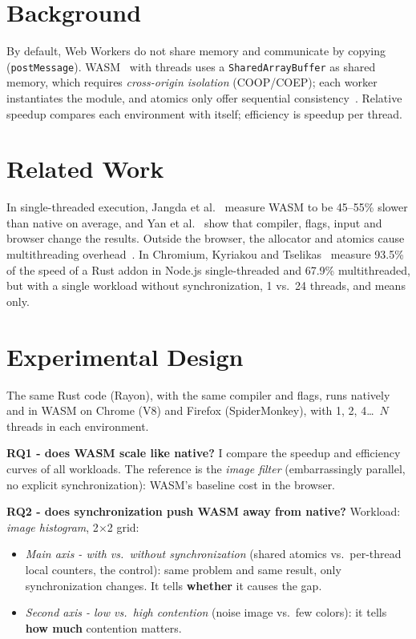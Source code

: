 \documentclass[sigplan]{acmart}
\begin{document}
\section{Background} \label{sec:background}

By default, Web Workers do not share memory and communicate by copying
(\texttt{postMessage}). WASM~\cite{haas2017} with threads uses a
\texttt{Shared\-Array\-Buffer} as shared memory, which requires
\emph{cross-origin isolation} (COOP/COEP); each worker instantiates the module,
and atomics only offer sequential consistency~\cite{sanchez2025}. Relative
speedup compares each environment with itself; efficiency is speedup per thread.

\section{Related Work} \label{sec:relatedwork}

In single-threaded execution, Jangda et al.~\cite{jangda2019} measure WASM to be 45--55\%
slower than native on average, and Yan et al.~\cite{yan2021} show that compiler,
flags, input and browser change the results. Outside the browser, the allocator
and atomics cause multithreading overhead~\cite{sanchez2025}. In Chromium,
Kyriakou and Tselikas~\cite{kyriakou2022} measure 93.5\% of the speed of a
Rust addon in Node.js single-threaded and 67.9\% multithreaded, but with a
single workload without synchronization, 1 vs.\ 24 threads, and means only.

\section{Experimental Design} \label{sec:work1}

\noindent The same Rust code (Rayon), with the same compiler and flags, runs
natively and in WASM on Chrome (V8) and Firefox (SpiderMonkey), with 1, 2,
4\ldots\ $N$ threads in each environment.

\noindent\textbf{RQ1 - does WASM scale like native?} I compare the speedup and
efficiency curves of all workloads. The reference is the \emph{image filter}
(embarrassingly parallel, no explicit synchronization): WASM's baseline cost in the browser.

\noindent\textbf{RQ2 - does synchronization push WASM away from native?}
Workload: \emph{image histogram}, 2$\times$2 grid:
\begin{itemize}[nosep,leftmargin=*]
  \item \emph{Main axis - with vs.\ without synchronization} (shared atomics
  vs.\ per-thread local counters, the control): same problem and same result,
  only synchronization changes. It tells \textbf{whether} it causes the gap.
  \item \emph{Second axis - low vs.\ high contention} (noise image vs.\ few
  colors): it tells \textbf{how much} contention matters.
\end{itemize}
\end{document}
